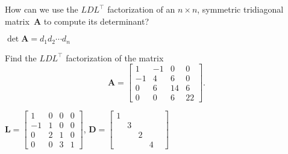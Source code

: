 \begin{Exercises}
\exercise
How can we use the $LDL^\top$ factorization of an $n\times n$, symmetric 
tridiagonal matrix~$\boldsymbol{A}$ to compute its determinant?
\begin{ans} 
$\det\boldsymbol{A}=d_1d_2\cdots d_n$
\end{ans}

\exercise
Find the $LDL^\top$ factorization of the matrix
\[
\boldsymbol{A}=\begin{bmatrix}1&-1&0&0\\ -1&4&6&0\\ 0&6&14&6\\ 0&0&6&22
\end{bmatrix}.
\]
\begin{ans}
$\boldsymbol{L}=\begin{bmatrix}1&0&0&0\\ -1&1&0&0\\ 0&2&1&0\\ 0&0&3&1 
\end{bmatrix}$,
$\boldsymbol{D}=\begin{bmatrix}1&&&\\ &3&&\\ &&2&&\\ &&&4\end{bmatrix}$
\end{ans}


\end{Exercises}
